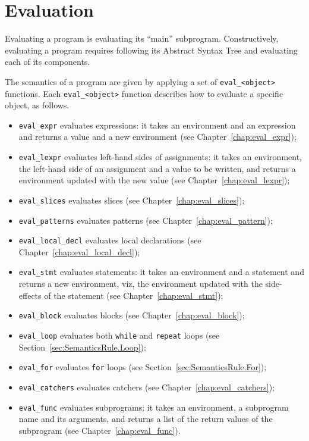 \documentclass{book}
\begin{document}
\section{Evaluation}

Evaluating a program is evaluating its ``main'' subprogram.
Constructively, evaluating a program requires following its
Abstract Syntax Tree and evaluating each of its components.

The semantics of a program are given by applying a set of
\texttt{eval\_<object>} functions. Each \texttt{eval\_<object>} function
describes how to evaluate a specific object, as follows.
\begin{itemize}
\item \texttt{eval\_expr} evaluates expressions: it takes an
environment and an expression and returns a value and a
new environment (see Chapter~\ref{chap:eval_expr});
\item \texttt{eval\_lexpr} evaluates left-hand sides of assignments: it takes
an environment, the left-hand side of an assignment and a value to be written,
and returns a environment updated with the new value (see
Chapter~\ref{chap:eval_lexpr});
\item \texttt{eval\_slices} evaluates slices (see Chapter~\ref{chap:eval_slices});
\item \texttt{eval\_patterns} evaluates patterns (see Chapter~\ref{chap:eval_pattern});
\item \texttt{eval\_local\_decl} evaluates local declarations (see Chapter~\ref{chap:eval_local_decl});
\item \texttt{eval\_stmt} evaluates statements: it takes an
environment and a statement and returns a new
environment, viz, the environment updated with the side-effects
of the statement (see Chapter~\ref{chap:eval_stmt});
\item \texttt{eval\_block} evaluates blocks (see Chapter~\ref{chap:eval_block});
\item \texttt{eval\_loop} evaluates both \texttt{while} and \texttt{repeat} loops (see Section~\ref{sec:SemanticsRule.Loop});
\item \texttt{eval\_for} evaluates \texttt{for} loops (see Section~\ref{sec:SemanticsRule.For});
\item \texttt{eval\_catchers} evaluates catchers (see Chapter~\ref{chap:eval_catchers});
\item \texttt{eval\_func} evaluates subprograms: it takes an
environment, a subprogram name and its arguments, and returns a
list of the return values of the subprogram (see Chapter~\ref{chap:eval_func}). 
\end{itemize}
\end{document}

